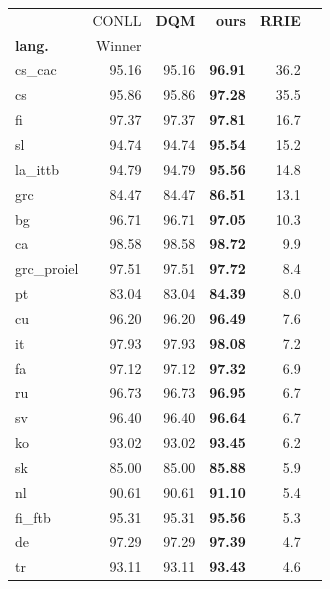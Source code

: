\documentclass[11pt,a4paper]{article}
\begin{document}
\begin{table}[]
\begin{center}
\small
\renewcommand{\arraystretch}{.95}
\begin{tabular}{|l|r||r|r|r|r|}
\hline 
            &    CONLL    & \bf{DQM}   & \bf ours   &\bf RRIE \\
\bf lang.   &    Winner   &            &            &         \\ \hline
cs\_cac     &      95.16  &     95.16  & \bf 96.91  &     36.2\\
cs          &      95.86  &     95.86  & \bf 97.28  &     35.5\\
fi          &      97.37  &     97.37  & \bf 97.81  &     16.7\\
sl          &      94.74  &     94.74  & \bf 95.54  &     15.2\\
la\_ittb    &      94.79  &     94.79  & \bf 95.56  &     14.8\\
grc         &      84.47  &     84.47  & \bf 86.51  &     13.1\\
bg          &      96.71  &     96.71  & \bf 97.05  &     10.3\\
ca          &      98.58  &     98.58  & \bf 98.72  &      9.9\\
grc\_proiel &      97.51  &     97.51  & \bf 97.72  &      8.4\\
pt          &      83.04  &     83.04  & \bf 84.39  &      8.0\\
cu          &      96.20  &     96.20  & \bf 96.49  &      7.6\\
it          &      97.93  &     97.93  & \bf 98.08  &      7.2\\
fa          &      97.12  &     97.12  & \bf 97.32  &      6.9\\
ru          &      96.73  &     96.73  & \bf 96.95  &      6.7\\
sv          &      96.40  &     96.40  & \bf 96.64  &      6.7\\
ko          &      93.02  &     93.02  & \bf 93.45  &      6.2\\
sk          &      85.00  &     85.00  & \bf 85.88  &      5.9\\
nl          &      90.61  &     90.61  & \bf 91.10  &      5.4\\
fi\_ftb     &      95.31  &     95.31  & \bf 95.56  &      5.3\\
de          &      97.29  &     97.29  & \bf 97.39  &      4.7\\
tr          &      93.11  &     93.11  & \bf 93.43  &      4.6\\

\end{tabular}
\end{center}
\end{table}
\end{document}
